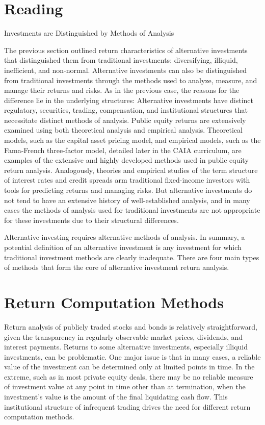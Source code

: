 \documentclass[11pt]{article}
\begin{document}
\section*{Reading}
Investments are Distinguished by Methods of Analysis

The previous section outlined return characteristics of alternative investments that distinguished them from traditional investments: diversifying, illiquid, inefficient, and non-normal. Alternative investments can also be distinguished from traditional investments through the methods used to analyze, measure, and manage their returns and risks. As in the previous case, the reasons for the difference lie in the underlying structures: Alternative investments have distinct regulatory, securities, trading, compensation, and institutional structures that necessitate distinct methods of analysis. Public equity returns are extensively examined using both theoretical analysis and empirical analysis. Theoretical models, such as the capital asset pricing model, and empirical models, such as the Fama-French three-factor model, detailed later in the CAIA curriculum, are examples of the extensive and highly developed methods used in public equity return analysis. Analogously, theories and empirical studies of the term structure of interest rates and credit spreads arm traditional fixed-income investors with tools for predicting returns and managing risks. But alternative investments do not tend to have an extensive history of well-established analysis, and in many cases the methods of analysis used for traditional investments are not appropriate for these investments due to their structural differences.

Alternative investing requires alternative methods of analysis. In summary, a potential definition of an alternative investment is any investment for which traditional investment methods are clearly inadequate. There are four main types of methods that form the core of alternative investment return analysis.

\section*{Return Computation Methods}
Return analysis of publicly traded stocks and bonds is relatively straightforward, given the transparency in regularly observable market prices, dividends, and interest payments. Returns to some alternative investments, especially illiquid investments, can be problematic. One major issue is that in many cases, a reliable value of the investment can be determined only at limited points in time. In the extreme, such as in most private equity deals, there may be no reliable measure of investment value at any point in time other than at termination, when the investment's value is the amount of the final liquidating cash flow. This institutional structure of infrequent trading drives the need for different return computation methods.
\end{document}
